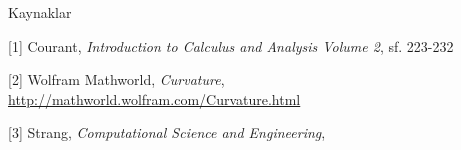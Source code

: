 \documentclass[12pt,fleqn]{article}\usepackage{../../common}
\begin{document}
Kaynaklar

[1] Courant, {\em Introduction to Calculus and Analysis Volume 2}, sf. 223-232

[2] Wolfram Mathworld, {\em Curvature}, \url{http://mathworld.wolfram.com/Curvature.html}

[3] Strang, {\em Computational Science and Engineering}, 
\end{document}
